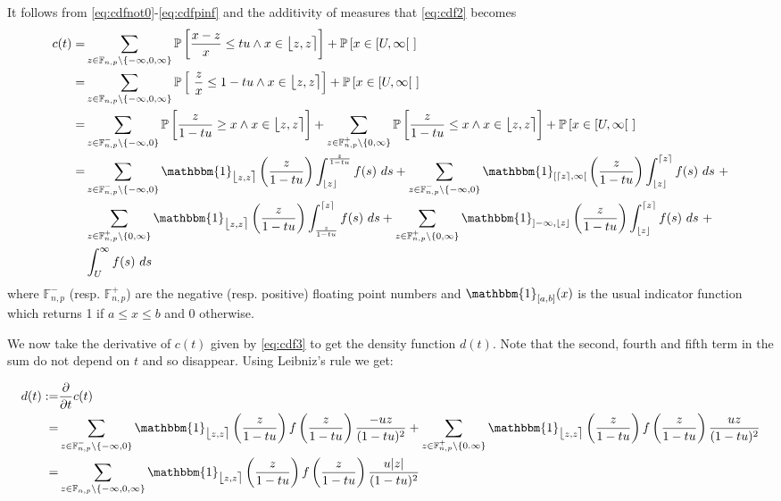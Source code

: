 \documentclass[10pt,a4paper]{article}
\theoremstyle{plain}
\theoremstyle{definition}
\newcommand{\F}[1][n,p]{\mathbb{F}_{#1}}
\newcommand{\one}{\mathbbm{1}}
\newcommand{\ceil}[1]{\lceil #1 \rceil}
\newcommand{\floor}[1]{\lfloor #1 \rfloor}
\newcommand{\fintvl}[1][x]{\mathlarger{\lfloor}#1,#1\mathlarger{\rceil}}
\newcommand{\absv}[1]{\vert #1\vert}
\newcommand{\Pro}[1]{\mathbb{P}\left[ #1 \right]}
\newcommand{\dt}{\frac{\partial}{\partial t}}
\begin{document}
It follows from \eqref{eq:cdfnot0}-\eqref{eq:cdfpinf} and the additivity of measures that \eqref{eq:cdf2} becomes
\begin{align}
c(t)=&\sum_{z\in\F\setminus\{-\infty,0,\infty\}}\Pro{\frac{x-z}{x}\leq tu\wedge x\in \fintvl[z]}+\Pro{x\in [U,\infty[~}\nonumber
\\
=&\sum_{z\in\F\setminus\{-\infty,0,\infty\}}\Pro{~\frac{z}{x}\leq 1-tu\wedge x\in \fintvl[z]}+\Pro{x\in [U,\infty[~} \nonumber
\\
=&\sum_{z\in\F^-\setminus\{-\infty,0\}}\Pro{\frac{z}{1-tu}\geq x\wedge x\in \fintvl[z]}+\sum_{z\in\F^+\setminus\{0,\infty\}}\Pro{\frac{z}{1-tu}\leq x \wedge x\in \fintvl[z]}+\Pro{x\in [U,\infty[~} \nonumber 
\\
=&\sum_{z\in\F^-\setminus\{-\infty,0\}}\one_{\fintvl[z]}\left(\frac{z}{1-tu}\right) \int^{\frac{z}{1-tu}}_{\floor{z}} f(s)~ds+ \sum_{z\in\F^-\setminus\{-\infty,0\}}\one_{[\ceil{z},\infty[}\left(\frac{z}{1-tu}\right) \int^{\ceil{z}}_{\floor{z}} f(s)~ds~+ \nonumber 
\\
&\sum_{z\in\F^+\setminus\{0,\infty\}}\one_{\fintvl[z]}\left(\frac{z}{1-tu}\right) \int^{\ceil{z}}_{\frac{z}{1-tu}} f(s)~ds+\sum_{z\in\F^+\setminus\{0,\infty\}}\one_{]-\infty,\floor{z}}\left(\frac{z}{1-tu}\right) \int_{\floor{z}}^{\ceil{z}} f(s)~ds~+
\nonumber \\
&\int_U^\infty f(s)~ds \label{eq:cdf3}
\end{align}
where $\F^-$ (resp. $\F^+$) are the negative (resp. positive) floating point numbers and $\one_{[a,b]}(x)$ is the usual indicator function which returns 1 if $a\leq x\leq b$ and 0 otherwise.




We now take the derivative of $c(t)$ given by \eqref{eq:cdf3} to get the density function $d(t)$. Note that the second, fourth and fifth term in the sum do not depend on $t$ and so disappear. Using Leibniz's rule we get:

\begin{align}
d(t):=&\dt c(t)\nonumber \\
=& \sum_{z\in\F^-\setminus\{-\infty,0\}}\one_{\fintvl[z]}\left(\frac{z}{1-tu}\right) f\left(\frac{z}{1-tu}\right) \frac{-uz}{(1-tu)^2}+\sum_{z\in\F^+\setminus\{0.\infty\}}\one_{\fintvl[z]}\left(\frac{z}{1-tu}\right) f\left(\frac{z}{1-tu}\right) \frac{uz}{(1-tu)^2}\nonumber \\
=&\sum_{z\in\F\setminus\{-\infty,0,\infty\}}\one_{\fintvl[z]}\left(\frac{z}{1-tu}\right) f\left(\frac{z}{1-tu}\right) \frac{u\absv{z}}{(1-tu)^2}
\label{eq:pdf}
\end{align}
\end{document}

